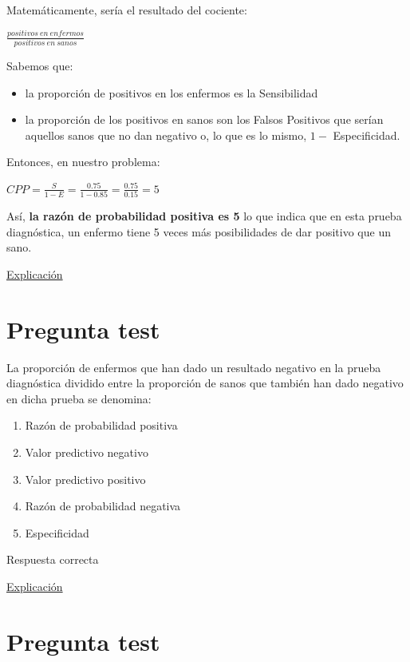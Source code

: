 \documentclass[
]{book}
\providecommand{\tightlist}{%
  \setlength{\itemsep}{0pt}\setlength{\parskip}{0pt}}
\begin{document}
Matemáticamente, sería el resultado del cociente:

\(\frac{positivos ~ en ~ enfermos}{positivos ~ en ~ sanos}\)

Sabemos que:

\begin{itemize}
\tightlist
\item
  la proporción de positivos en los enfermos es la Sensibilidad
\item
  la proporción de los positivos en sanos son los Falsos Positivos que serían aquellos sanos que no dan negativo o, lo que es lo mismo, \(1 -\) Especificidad.
\end{itemize}

Entonces, en nuestro problema:

\(CPP= \frac{S}{1-E}= \frac{0.75}{1-0.85}=\frac{0.75}{0.15}=5\)

Así, \textbf{la razón de probabilidad positiva es 5} lo que indica que en esta prueba diagnóstica, un enfermo tiene 5 veces más posibilidades de dar positivo que un sano.

\href{https://www.elsevier.es/es-revista-revista-argentina-radiologia-383-articulo-likelihood-ratio-razon-verosimilitud-definicion-S0048761916301910}{Explicación}

\hypertarget{pregunta-test-109}{%
\section{Pregunta test}\label{pregunta-test-109}}

La proporción de enfermos que han dado un resultado negativo en la prueba diagnóstica dividido entre la proporción de sanos que también han dado negativo en dicha prueba se denomina:

\begin{enumerate}
\def\labelenumi{\alph{enumi})}
\tightlist
\item
  Razón de probabilidad positiva
\item
  Valor predictivo negativo
\item
  Valor predictivo positivo
\item
  Razón de probabilidad negativa
\item
  Especificidad
\end{enumerate}

Respuesta correcta

\href{https://www.redalyc.org/journal/3555/355568264003/html/}{Explicación}

\hypertarget{pregunta-test-110}{%
\section{Pregunta test}\label{pregunta-test-110}}
\end{document}
